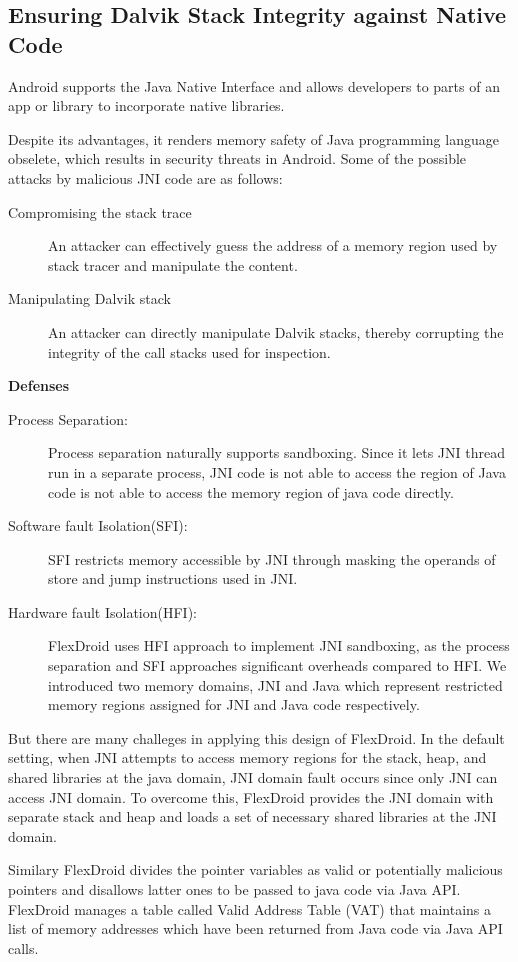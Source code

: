 \documentclass[11pt]{report}
\begin{document}
\subsection{Ensuring Dalvik Stack Integrity against Native Code}
\par Android supports the Java Native Interface and allows developers to parts of an app or library to incorporate native libraries.
\par Despite its advantages, it renders memory safety of Java programming language obselete, which results in security threats in Android. Some of the possible attacks by malicious
JNI code are as follows:
\begin{description}
 \item [Compromising the stack trace] \par An attacker can effectively guess the address of a memory region used by stack tracer and manipulate the content.
 \item [Manipulating Dalvik stack] \par An attacker can directly manipulate Dalvik stacks, thereby corrupting the integrity of the call stacks used for inspection.
\end{description}

\par \textbf{Defenses}
\begin{description}
 \item [Process Separation:]
	Process separation naturally supports sandboxing. Since it lets JNI thread run in a separate process, JNI code is not able to access the region of Java code is not able to
	access the memory region of java code directly.
 \item [Software fault Isolation(SFI):]
	SFI restricts memory accessible by JNI through masking the operands of store and jump instructions used in JNI.	
 \item [Hardware fault Isolation(HFI):]
	FlexDroid uses HFI approach to implement JNI sandboxing, as the process separation and SFI approaches significant overheads compared to HFI. We introduced two memory 
	domains, JNI and Java which represent restricted memory regions assigned for JNI and Java code respectively.	
\end{description}
\par But there are many challeges in applying this design of FlexDroid. In the default setting, when JNI attempts to access memory regions for the stack, heap, and shared  
libraries at the java domain, JNI domain fault occurs since only JNI can access JNI domain. To overcome this, FlexDroid provides the JNI domain with separate stack and heap and 
loads a set of necessary shared libraries at the JNI domain.
\par Similary FlexDroid divides the pointer variables as valid or potentially malicious pointers and disallows latter ones to be passed to java code via Java API. 
FlexDroid manages a table called Valid Address Table (VAT) that maintains a list of memory addresses which have been returned from Java code via Java API calls.
\end{document}
